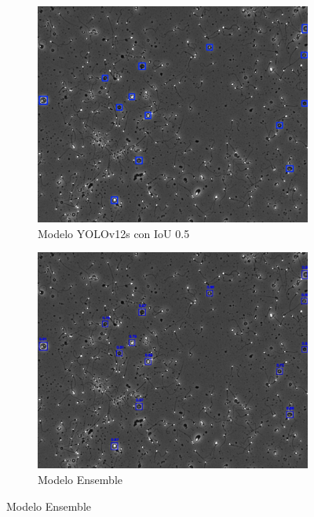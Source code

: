 \documentclass[12pt,a4paper,onecolumn,oneside]{report}
\begin{document}
\begin{figure}[H]
  \vspace{0.3cm} 
  
  \begin{subfigure}[b]{0.48\textwidth}
    \centering
    \includegraphics[width=\textwidth]{figuras/evaluacion_cualitativa/7/7_v12.jpg}
    \caption{Modelo YOLOv12s con IoU 0.5}
    \label{fig:yolov12s_IoU0.5_image_7}
  \end{subfigure}
  \hfill
  \begin{subfigure}[b]{0.48\textwidth}
    \centering
    \includegraphics[width=\textwidth]{figuras/evaluacion_cualitativa/7/7_ensemble.jpg}
    \caption{Modelo Ensemble}
    \label{fig:ensemble_image_7}
  \end{subfigure}


\end{figure}
\end{document}
